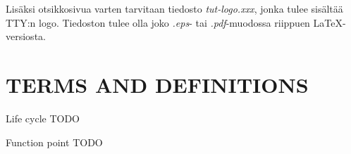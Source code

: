 Lisäksi otsikkosivua varten tarvitaan tiedosto \textit{tut-logo.xxx}, jonka
tulee sisältää TTY:n logo. Tiedoston tulee
olla joko \textit{.eps}- tai \textit{.pdf}-muodossa riippuen \LaTeX-versiosta.
 
\newpage
\tableofcontents
\newpage
\chapter*{TERMS AND DEFINITIONS}
 
 
\begin{termiluettelo}
 
\item [Life cycle] TODO
\item [Function point] TODO
 
\end{termiluettelo} 
 
 
\newpage
\renewcommand{\chaptermark}[1]{\markboth{\thechapter. \ #1}{}}
\renewcommand{\sectionmark}[1]{\markright{}{}}
\lhead{\fancyplain{}{\leftmark}}
 
